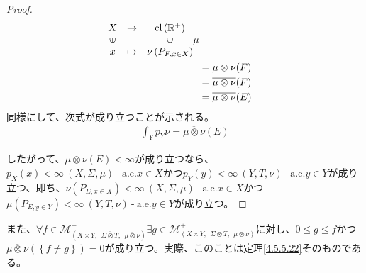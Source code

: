 \documentclass[dvipdfmx]{jsarticle}
\begin{document}
\begin{proof}
\begin{align*}
{\begin{matrix}
X & \rightarrow & \mathrm{cl}\left( \mathbb{R}^{+} \right) \\
\text{\rotatebox[origin=c]{90}{$\in$}} & & \text{\rotatebox[origin=c]{90}{$\in$}} \\
x & \mapsto & \nu\left( P_{F,x \in X} \right) \\
\end{matrix}\mu}\\
&= \mu \otimes \nu(F)\\
&= \overline{\mu \otimes \nu}(F)\\
&= \overline{\mu \otimes \nu}(E)
\end{align*}
同様にして、次式が成り立つことが示される。
\begin{align*}
\int_{Y} {p_{Y}\nu} = \overline{\mu \otimes \nu}(E)
\end{align*}\par
したがって、$\overline{\mu \otimes \nu}(E) < \infty$が成り立つなら、$p_{X}(x) < \infty\ (X,\varSigma,\mu) \ \text{-} \ \mathrm{a.e.}x \in X$かつ$p_{Y}(y) < \infty\ (Y,T,\nu) \ \text{-} \ \mathrm{a.e.}y \in Y$が成り立つ、即ち、$\nu\left( P_{E,x \in X} \right) < \infty\ (X,\varSigma,\mu) \ \text{-} \ \mathrm{a.e.}x \in X$かつ$\mu\left( P_{E,y \in Y} \right) < \infty\ (Y,T,\nu) \ \text{-} \ \mathrm{a.e.}y \in Y$が成り立つ。
\end{proof}\par
また、$\forall f \in \mathcal{M}_{\left( X \times Y,\ \ \overline{\varSigma \otimes T},\ \ \overline{\mu \otimes \nu} \right)}^{+}\exists g \in \mathcal{M}_{(X \times Y,\ \ \varSigma \otimes T,\ \ \mu \otimes \nu)}^{+}$に対し、$0 \leq g \leq f$かつ$\overline{\mu \otimes \nu}\left( \left\{ f \neq g \right\} \right) = 0$が成り立つ。実際、このことは定理\ref{4.5.5.22}そのものである。
\end{document}
